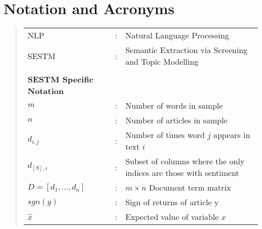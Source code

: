 \documentclass[ oneside,tikz,%
                    author={Joshua Felmeden},
                    degree={MEng},
                     title={Semantic Analysis of Financial Headlines Based on Realised Stock Returns},
                  subtitle={Research}]{dissertation}
\begin{document}

\chapter*{Notation and Acronyms}

\begin{quote}
\noindent
\begin{tabular}{lcl}
NLP               &:    &     Natural Language Processing \\
SESTM             &:    &     Semantic Extraction via Screening and Topic Modelling \\
\\
\textbf{SESTM Specific Notation} \\
$m$               &:    &     Number of words in sample \\
$n$               &:    &     Number of articles in sample \\
$d_{i,j}$         &:    &     Number of times word $j$ appears in text $i$ \\
$d_{[S],i}$       &:    &     Subset of columns where the only indices are those with sentiment \\
$D = [d_1, \dots, d_n]$ &:    & $m \times n$ Document term matrix \\
$sgn(y)$          &:    &     Sign of returns of article y \\
$\hat x$          &:    &    Expected value of variable $x$ \\
\end{tabular}
\end{quote}



%

\mainmatter



\end{document}
